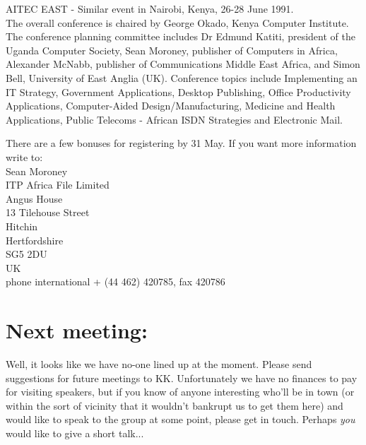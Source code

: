 AITEC EAST - Similar event in Nairobi, Kenya, 26-28 June 1991.\\
The overall conference is chaired by George Okado, Kenya Computer 
Institute. The conference planning committee includes Dr Edmund 
Katiti, president of the Uganda Computer Society, Sean Moroney, 
publisher of Computers in Africa, Alexander McNabb, publisher of 
Communications Middle East Africa, and Simon Bell, University of 
East Anglia (UK).
Conference topics include Implementing an IT Strategy, Government 
Applications, Desktop Publishing, Office Productivity Applications, 
Computer-Aided Design/Manufacturing, Medicine and Health 
Applications, Public Telecoms - African ISDN Strategies and 
Electronic Mail.

There are a few bonuses for registering by 31 May. If you want more 
information write to:\\
  Sean Moroney\\
  ITP Africa File Limited\\
  Angus House\\
  13 Tilehouse Street\\
  Hitchin\\
  Hertfordshire\\
  SG5 2DU\\
  UK\\
phone international + (44 462) 420785, fax 420786

\section{Next meeting:}
Well, it looks like we have no-one lined up at the moment.
Please send suggestions for future meetings to KK. Unfortunately we
have no finances to pay for visiting speakers, but if you know of
anyone interesting who'll be in town (or within the sort of vicinity
that it wouldn't bankrupt us to get them here) and would like to speak
to the group at some point, please get in touch. Perhaps {\em you}
would like to give a short talk...


